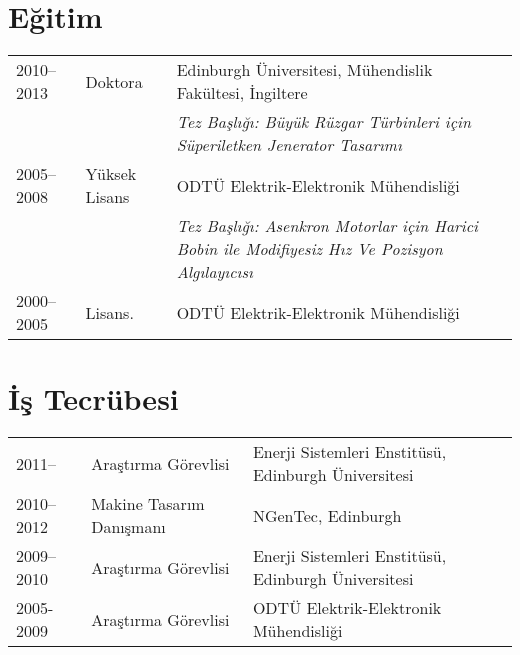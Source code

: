 \documentclass[a4paper,12pt]{article}
\begin{document}
\maketitle
 
\section{Eğitim}
\begin{tabular}{llp{12cm}}
 2010--2013 & Doktora & Edinburgh  Üniversitesi, Mühendislik Fakültesi, İngiltere\\  
& & \textit{Tez Başlığı: Büyük Rüzgar Türbinleri için Süperiletken Jenerator Tasarımı} \\ 
 2005--2008 & Yüksek Lisans & ODTÜ Elektrik-Elektronik Mühendisliği\\
& & \textit{Tez Başlığı: Asenkron Motorlar için Harici Bobin ile Modifiyesiz Hız Ve Pozisyon Algılayıcısı}\\
 2000--2005 & Lisans. & ODTÜ Elektrik-Elektronik Mühendisliği \\

\end{tabular}

\section{İş Tecrübesi}

\begin{tabular}{lp{3.6cm}l}
2011-- & Araştırma Görevlisi & Enerji Sistemleri Enstitüsü, Edinburgh Üniversitesi \\ 
2010--2012 & Makine Tasarım Danışmanı & NGenTec, Edinburgh\\
2009--2010 & Araştırma Görevlisi & Enerji Sistemleri Enstitüsü, Edinburgh Üniversitesi \\ 
2005-2009 & Araştırma Görevlisi & ODTÜ Elektrik-Elektronik Mühendisliği \\
\end{tabular}



\end{document}
